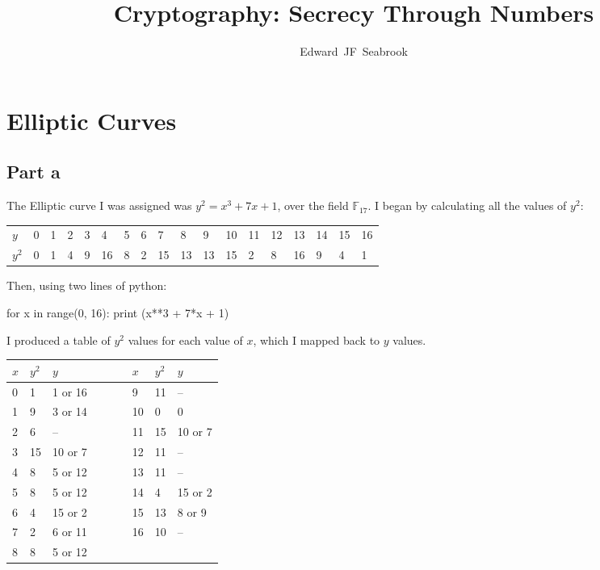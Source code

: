 \documentclass[11pt,a4paper,twoside]{article}
\begin{document}
\title{Cryptography: Secrecy Through Numbers}
\author{Edward~JF~Seabrook}

\maketitle

\section{Elliptic Curves}
\subsection{Part a}
The Elliptic curve I was assigned was $y^2 = x^3 + 7x + 1$, over the field
$\mathbb{F}_{17}$. I began by calculating all the values of $y^2$:

\begin{table}[H]
\centering
\begin{tabular}{l|lllllllllllllllll}
$y$   & 0 & 1 & 2 & 3 & 4  & 5 & 6 & 7  & 8  & 9  & 10 & 11 & 12 & 13 & 14 & 15 & 16 \\
$y^2$ & 0 & 1 & 4 & 9 & 16 & 8 & 2 & 15 & 13 & 13 & 15 & 2  & 8  & 16 & 9  & 4  & 1 
\end{tabular}
\end{table}

Then, using two lines of python:

\begin{python}
for x in range(0, 16):
    print (x**3 + 7*x + 1) %
\end{python}

I produced a table of $y^2$ values for each value of $x$, which I mapped back to $y$ values.\

\begin{table}[h]
\centering
\begin{tabular}{lllllllll}
$x$ & $y^2$ & $y$     & & & &  $x$ & $y^2$ & $y$     \\  \midrule
0   & 1     & 1 or 16 & & & & 9   & 11    & --      \\
1   & 9     & 3 or 14 & & & & 10  & 0     & 0       \\
2   & 6     & --      & & & & 11  & 15    & 10 or 7 \\
3   & 15    & 10 or 7 & & & & 12  & 11    & --      \\
4   & 8     & 5 or 12 & & & & 13  & 11    & --      \\
5   & 8     & 5 or 12 & & & & 14  & 4     & 15 or 2 \\
6   & 4     & 15 or 2 & & & & 15  & 13    & 8 or 9  \\
7   & 2     & 6 or 11 & & & & 16  & 10    & -- \\
8   & 8     & 5 or 12 
\end{tabular}
\end{table}
\end{document}
